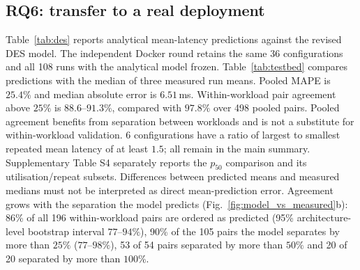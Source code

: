 \documentclass[preprint,11pt,3p]{elsarticle}
\theoremstyle{plain}
\theoremstyle{definition}
\newcommand{\WithinAgreementRange}{88.6\text{--}91.3}
\newcommand{\PooledAgreement}{97.8}
\begin{document}
\subsection{RQ6: transfer to a real deployment}
\providecommand{\RefFunnelSite}{Table~\ref{tab:funnel} and Fig.~\ref{fig:funnel}}
\providecommand{\RefFunnelTab}{Table~\ref{tab:funnel}}
\providecommand{\RefBaselinesTab}{Table~\ref{tab:baselines}}
\providecommand{\RefStatsTab}{Table~\ref{tab:stats}}
\providecommand{\RefHvFig}{Figure~\ref{fig:hv_budget}}
\providecommand{\RefCrossoverFig}{Fig.~\ref{fig:crossover}}
\providecommand{\RefAblationSite}{Table~\ref{tab:ablation} and Fig.~\ref{fig:ablation}}
\providecommand{\RefScalSite}{Table~\ref{tab:scalability} and Fig.~\ref{fig:scalability}}
\providecommand{\RefOrderTab}{Table~\ref{tab:order}}
\providecommand{\RefSolverTab}{Table~\ref{tab:solver}}
\providecommand{\RefDesTab}{Table~\ref{tab:des}}
\providecommand{\RefTestbedTab}{Table~\ref{tab:testbed}}
\providecommand{\RefReliabilityFig}{Fig.~\ref{fig:model_vs_measured}b}%
\RefDesTab{} reports analytical mean-latency predictions against the revised
DES model. The independent Docker round retains the same 36 configurations and all 108
runs with the analytical model frozen. \RefTestbedTab{} compares predictions with
the median of three measured run means. Pooled MAPE is $25.4\%$ and median absolute error is $6.51$\,ms. Within-workload pair agreement above $25\%$ is $\WithinAgreementRange\%$, compared with $\PooledAgreement\%$ over 498 pooled pairs. Pooled agreement benefits from separation between workloads and is not
a substitute for within-workload validation. 6 configurations have a ratio of largest to smallest repeated mean latency of at least
$1.5$; all remain in the main summary. Supplementary Table S4 separately reports the
$p_{50}$ comparison and its utilisation/repeat subsets. Differences between predicted
means and measured medians must not be interpreted as direct mean-prediction error.
Agreement grows with the separation the model predicts (\RefReliabilityFig{}): 86\% of all 196 within-workload pairs are ordered as predicted (95\% architecture-level bootstrap interval $77\text{--}94\%$), 90\% of the 105 pairs the model separates by more than $25\%$ ($77\text{--}98\%$), 53 of 54 pairs separated by more than $50\%$ and 20 of 20 separated by more than $100\%$.
\end{document}
